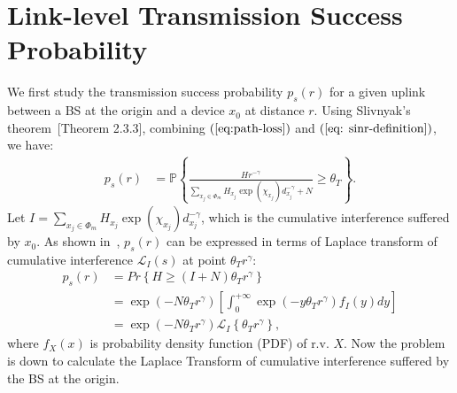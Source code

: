 \section{Link-level Transmission Success Probability}
\label{sec:trans_succ_p_pair}
We first study the transmission success probability $p_s(r)$ for a given uplink between a BS at the origin and a device $x_0$ at distance $r$. Using Slivnyak's theorem~\cite{vaze2015random}[Theorem 2.3.3], combining $(\ref{eq:path-loss})$ and $(\ref{eq: sinr-definition})$, we have:
\begin{align}
p_{s} \left( r\right)
& =\mathbb{P}\left\lbrace \frac{H r^{-\gamma}}{\sum_{x_j \in \Phi_{m}} H_{x_j} \exp(\chi_{x_j}) d_{x_j}^{-\gamma} + N}  \geq \theta_T \right\rbrace. \nonumber
\end{align}
Let $I=\sum_{x_j \in \Phi_{m}} H_{x_j} \exp(\chi_{x_j}) d_{x_j}^{-\gamma}$, which is the cumulative interference suffered by $x_0$. As shown in~\cite{haenggi2009interference}, $p_{s}\left( r \right)$ can be expressed in terms of Laplace transform of cumulative interference $\mathcal{L}_{I}(s)$ at point $\theta_{T} r^{\gamma}$:
\begin{align}
\label{eq:def_ps}
p_{s}\left( r \right)  &= Pr \left\lbrace H  \geq (I+N) \theta_{T} r ^{\gamma}  \right\rbrace \nonumber\\ 
&= \exp(-N \theta_{T} r^{\gamma} ) \left[ \int_{0}^{+\infty} \exp(-y \theta_{T} r^{\gamma} ) f_{I}(y)dy\right] \nonumber\\
&=  \exp(-N \theta_{T} r^{\gamma} ) \mathcal{L}_{I}\left\lbrace \theta_{T} r^{\gamma}\right\rbrace ,
\end{align}
where $f_{X} (x)$ is probability density function (PDF) of r.v. $X$. Now the problem is down to calculate the Laplace Transform of cumulative interference suffered by the BS at the origin.

